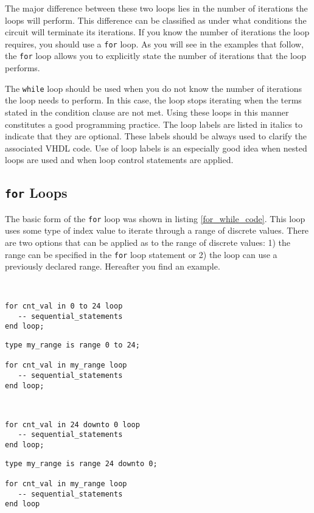 The major difference between these two loops lies in the number of iterations the loops will perform. This difference can be classified as under what conditions the circuit will terminate its iterations. If you know the number of iterations the loop requires, you should use a \texttt{for} loop. As you will see in the examples that follow, the \texttt{for} loop allows you to explicitly state the number of iterations that the loop performs. 

The \texttt{while} loop should be used when you do not know the number of iterations the loop needs to perform. In this case, the loop stops iterating when the terms stated in the condition clause are not met. Using these loops in this manner constitutes a good programming practice. The loop labels are listed in italics to indicate that they are optional. These labels should be always used to clarify the associated VHDL code. Use of loop labels is an especially good idea when nested loops are used and when loop control statements are applied. 

\subsection{\texttt{for} Loops}
The basic form of the \texttt{for} loop was shown in listing \ref{for_while_code}. This loop uses some type of index value to iterate through a range of discrete values. There are two options that can be applied as to the range of discrete values: 1) the range can be specified in the \texttt{for} loop statement or 2) the loop can use a previously declared range. Hereafter you find  an example.

\vspace{10pt}
\noindent
\begin{minipage}{0.5\linewidth}
\begin{lstlisting}


for cnt_val in 0 to 24 loop
   -- sequential_statements
end loop; 
\end{lstlisting}
\end{minipage}
\noindent
\begin{minipage}{0.5\linewidth}
\begin{lstlisting}
type my_range is range 0 to 24; 

for cnt_val in my_range loop
   -- sequential_statements
end loop; 
\end{lstlisting}
\end{minipage}
\noindent
\begin{minipage}{0.5\linewidth}
\begin{lstlisting}


for cnt_val in 24 downto 0 loop
   -- sequential_statements
end loop; 
\end{lstlisting}
\end{minipage}
\noindent
\begin{minipage}{0.5\linewidth}
\begin{lstlisting}
type my_range is range 24 downto 0; 

for cnt_val in my_range loop
   -- sequential_statements
end loop
\end{lstlisting}
\end{minipage}

